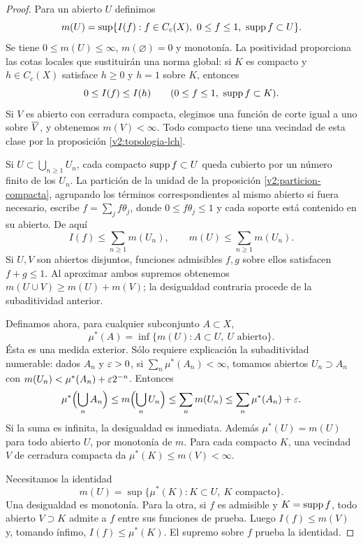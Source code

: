 \begin{proof}
Para un abierto $U$ definimos
\[
 m(U)=\sup\{I(f):f\in C_c(X),\ 0\le f\le1,\ \supp f\subset U\}.
\]
Se tiene $0\le m(U)\le\infty$, $m(\varnothing)=0$ y monotonía. La positividad proporciona las cotas locales que sustituirán una norma global: si $K$ es compacto y $h\in C_c(X)$ satisface $h\ge0$ y $h=1$ sobre $K$, entonces
\[
 0\le I(f)\le I(h)\qquad(0\le f\le1,\ \operatorname{supp} f\subset K).
\]
Si $V$ es abierto con cerradura compacta, elegimos una función de corte igual a uno sobre $\overline{V}$, y obtenemos $m(V)<\infty$. Todo compacto tiene una vecindad de esta clase por la proposición \ref{v2:topologia-lch}.

Si $U\subset\bigcup_{n\ge1}U_n$, cada compacto $\operatorname{supp} f\subset U$ queda cubierto por un número finito de los $U_n$. La partición de la unidad de la proposición \ref{v2:particion-compacta}, agrupando los términos correspondientes al mismo abierto si fuera necesario, escribe $f=\sum_j f\theta_j$, donde $0\le f\theta_j\le1$ y cada soporte está contenido en su abierto. De aquí
\[
 I(f)\le\sum_{n\ge1}m(U_n),\qquad m(U)\le\sum_{n\ge1}m(U_n).
\]
Si $U,V$ son abiertos disjuntos, funciones admisibles $f,g$ sobre ellos satisfacen $f+g\le1$. Al aproximar ambos supremos obtenemos $m(U\cup V)\ge m(U)+m(V)$; la desigualdad contraria procede de la subaditividad anterior.

Definamos ahora, para cualquier subconjunto $A\subset X$,
\[
 \mu^*(A)=\inf\{m(U):A\subset U,\ U\text{ abierto}\}.
\]
Ésta es una medida exterior. Sólo requiere explicación la subaditividad numerable: dados $A_n$ y $\varepsilon>0$, si $\sum_n\mu^*(A_n)<\infty$, tomamos abiertos $U_n\supset A_n$ con $m(U_n)<\mu^*(A_n)+\varepsilon2^{-n}$. Entonces
\[
 \mu^*\Bigl(\bigcup_n A_n\Bigr)\le m\Bigl(\bigcup_nU_n\Bigr)
 \le\sum_nm(U_n)\le\sum_n\mu^*(A_n)+\varepsilon.
\]
Si la suma es infinita, la desigualdad es inmediata. Además $\mu^*(U)=m(U)$ para todo abierto $U$, por monotonía de $m$. Para cada compacto $K$, una vecindad $V$ de cerradura compacta da $\mu^*(K)\le m(V)<\infty$.

Necesitamos la identidad
\begin{equation}\label{v2:riesz-interior-abiertos}
 m(U)=\sup\{\mu^*(K):K\subset U,\ K\text{ compacto}\}.
\end{equation}
Una desigualdad es monotonía. Para la otra, si $f$ es admisible y $K=\operatorname{supp} f$, todo abierto $V\supset K$ admite a $f$ entre sus funciones de prueba. Luego $I(f)\le m(V)$ y, tomando ínfimo, $I(f)\le\mu^*(K)$. El supremo sobre $f$ prueba la identidad.


\end{proof}
